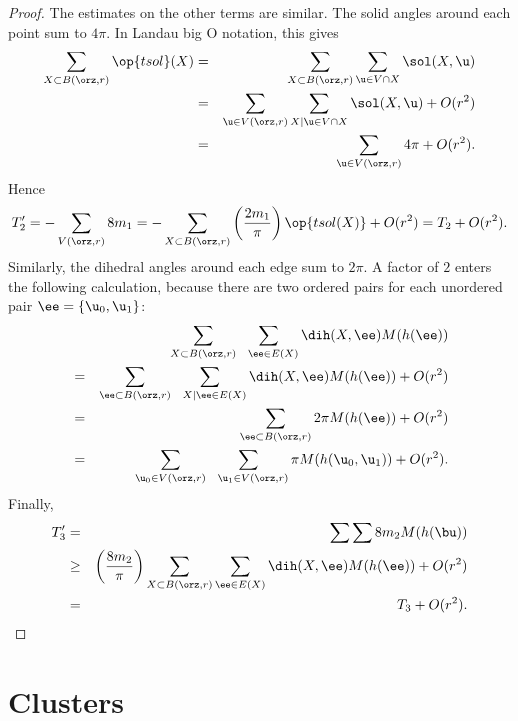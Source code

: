 \begin{proof}
The estimates on the other terms are similar.  The solid angles
around each point sum to $4\pi$.
In Landau big O notation, this gives
\begin{eqnarray*} 
\sum_{X\subset B(\orz,r)} \op{tsol}(X) &=& 
\sum_{X\subset B(\orz,r)} \sum_{ \u\in V\cap X} \sol(X, \u)\\
&=&\sum_{ \u\in  V(\orz,r)} \sum_{X\mid  \u\in V\cap X} \sol(X, \u) + O(r^2)\\
&=&\sum_{ \u\in  V(\orz,r)} 4\pi    + O(r^2).
\end{eqnarray*}
Hence
\begin{displaymath} 
T_2' = -\sum_{ V(\orz,r)} 8 m_1 = 
-\sum_{X\subset B(\orz,r)}\left(\frac{2m_1}\pi\right) \op{tsol(X)} + O(r^2) = T_2 + O(r^2).
\end{displaymath}
Similarly, the dihedral angles around each edge sum to $2\pi$.  A
factor of $2$ enters the following calculation, because there are two
ordered pairs for each unordered pair $\ee=\{ \u_0, \u_1\}$:
\begin{eqnarray*} 
&\phantom{=}&\sum_{X\subset B(\orz,r)} \sum_{~~\ee\in E(X)} \dih(X,\ee)  M(h(\ee)) \vspace{3pt}\\
&=&\sum_{\ee\subset B(\orz,r)} \sum_{~~X\mid \ee\in E(X)} \dih(X,\ee)  M(h(\ee)) +O(r^2)\vspace{3pt}\\
&=&\sum_{\ee\subset B(\orz,r)} 2\pi M(h(\ee)) + O(r^2)\vspace{3pt} \\
&=&\sum_{ \u_0\in  V(\orz,r)} \sum_{~~\u_1\in  V(\orz,r) } \pi M(h( \u_0, \u_1)) + O(r^2).\\
\end{eqnarray*}
Finally,
\begin{eqnarray*} 
T_3' &=& \sum\sum 8 m_2 M(h(\bu)) \\
&\ge& \left(\frac{8m_2}\pi\right)
\sum_{X\subset B(\orz,r)}\sum_{\ee\in E(X)}\dih(X,\ee) M(h(\ee)) + O(r^2) \\
&=& T_3 + O(r^2).
\end{eqnarray*}
\end{proof}




\section{Clusters}

